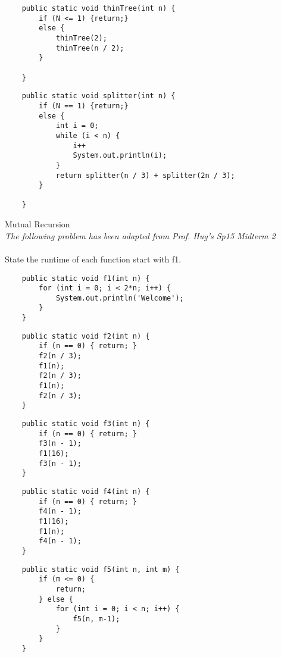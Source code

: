 \documentclass[11pt,letterpaper]{article}
\begin{document}
\begin{lstlisting}
    public static void thinTree(int n) {
        if (N <= 1) {return;}
        else {
            thinTree(2);
            thinTree(n / 2);
        }
        
    }
\end{lstlisting}
\pspace
\pspace
\pspace
\pspace

\begin{lstlisting}
    public static void splitter(int n) {
        if (N == 1) {return;}
        else {
            int i = 0;
            while (i < n) {
                i++
                System.out.println(i);
            }
            return splitter(n / 3) + splitter(2n / 3);
        }
        
    }
\end{lstlisting}
\newpage




\problem Mutual Recursion 
\\
\textit{The following problem has been adapted from Prof. Hug's Sp15 Midterm 2}
\\
\\
State the runtime of each function start with f1.
\begin{lstlisting}
    public static void f1(int n) {
        for (int i = 0; i < 2*n; i++) {
            System.out.println('Welcome');
        }
    }
\end{lstlisting}

\begin{lstlisting}
    public static void f2(int n) {
        if (n == 0) { return; }
        f2(n / 3);
        f1(n);
        f2(n / 3);
        f1(n);
        f2(n / 3);
    }
\end{lstlisting}

\begin{lstlisting}
    public static void f3(int n) {
        if (n == 0) { return; }
        f3(n - 1);
        f1(16);
        f3(n - 1);
    }
\end{lstlisting}

\begin{lstlisting}
    public static void f4(int n) {
        if (n == 0) { return; }
        f4(n - 1);
        f1(16);
        f1(n);
        f4(n - 1);
    }
\end{lstlisting}

\begin{lstlisting}
    public static void f5(int n, int m) {
        if (m <= 0) {
            return;
        } else {
            for (int i = 0; i < n; i++) {
                f5(n, m-1);
            }
        }
    }
\end{lstlisting}
\end{document}
